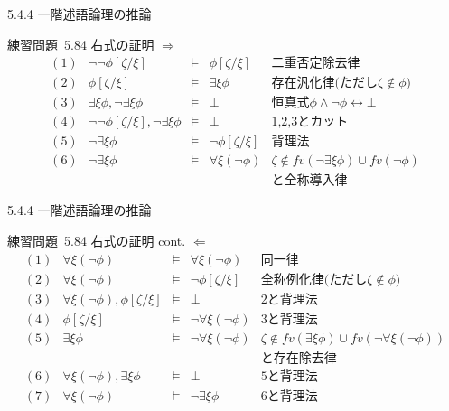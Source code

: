 \documentclass[dvipdfmx,11pt]{beamer}
\begin{document}
\begin{frame}{5.4.4 一階述語論理の推論}
  \begin{block}{練習問題~5.84 右式の証明}
    \(\Rightarrow\)
    \[
    \begin{array}{rrcll}
      (1) & \neg\neg\phi[\zeta/\xi] & \vDash & \phi[\zeta/\xi] & \textit{二重否定除去律} \\
      (2) & \phi[\zeta/\xi] & \vDash & \exists\xi\phi & \textit{存在汎化律(ただし\(\zeta\not\in\phi\))} \\
      (3) & \exists\xi\phi, \neg\exists\xi\phi & \vDash & \bot & \textit{恒真式}\phi\wedge\neg\phi\leftrightarrow\bot \\
      (4) & \neg\neg\phi[\zeta/\xi], \neg\exists\xi\phi & \vDash & \bot & \textit{1,2,3とカット} \\
      (5) & \neg\exists\xi\phi & \vDash & \neg\phi[\zeta/\xi] & \textit{背理法} \\
      (6) & \neg\exists\xi\phi & \vDash & \forall\xi(\neg\phi) & \zeta\not\in\textit{fv}(\neg\exists\xi\phi)\cup\textit{fv}(\neg\phi) \\
      & & & & \textit{と全称導入律}
    \end{array}
    \]
  \end{block}
\end{frame}

\begin{frame}{5.4.4 一階述語論理の推論}
  \begin{block}{練習問題~5.84 右式の証明 cont.}
    \(\Leftarrow\)
    \[
    \begin{array}{rrcll}
      (1) & \forall\xi(\neg\phi) & \vDash & \forall\xi(\neg\phi) & \textit{同一律} \\
      (2) & \forall\xi(\neg\phi) & \vDash & \neg\phi[\zeta/\xi] & \textit{全称例化律(ただし\(\zeta\not\in\phi\))} \\
      (3) & \forall\xi(\neg\phi), \phi[\zeta/\xi] & \vDash & \bot & \textit{2と背理法} \\
      (4) & \phi[\zeta/\xi] & \vDash & \neg\forall\xi(\neg\phi) & \textit{3と背理法} \\
      (5) & \exists\xi\phi & \vDash & \neg\forall\xi(\neg\phi) & \zeta\not\in\textit{fv}(\exists\xi\phi)\cup\textit{fv}(\neg\forall\xi(\neg\phi)) \\
      & & & & \textit{と存在除去律} \\
      (6) & \forall\xi(\neg\phi), \exists\xi\phi & \vDash & \bot & \textit{5と背理法} \\
      (7) & \forall\xi(\neg\phi) & \vDash & \neg\exists\xi\phi & \textit{6と背理法} \\
    \end{array}
    \]
  \end{block}
\end{frame}
\end{document}
